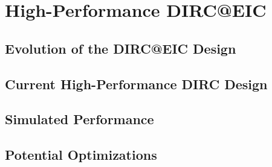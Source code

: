 \chapter{High-Performance DIRC@EIC}
\section{Evolution of the DIRC@EIC Design}
\section{Current High-Performance DIRC Design}
\section{Simulated Performance}
\section{Potential Optimizations}